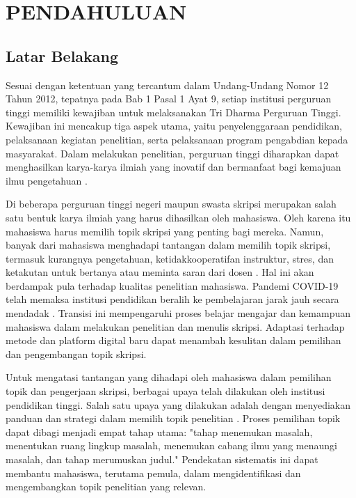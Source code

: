 \chapter{PENDAHULUAN}

\section{Latar Belakang}
Sesuai dengan ketentuan yang tercantum dalam Undang-Undang Nomor 12 Tahun 2012, tepatnya pada Bab 1 Pasal 1 Ayat 9, setiap institusi perguruan tinggi memiliki kewajiban untuk melaksanakan Tri Dharma Perguruan Tinggi. Kewajiban ini mencakup tiga aspek utama, yaitu penyelenggaraan pendidikan, pelaksanaan kegiatan penelitian, serta pelaksanaan program pengabdian kepada masyarakat. Dalam melakukan penelitian, perguruan tinggi diharapkan dapat menghasilkan karya-karya ilmiah yang inovatif dan bermanfaat bagi kemajuan ilmu pengetahuan \cite{bourner2020contribution}.

Di beberapa perguruan tinggi negeri maupun swasta skripsi merupakan salah satu bentuk karya ilmiah yang harus dihasilkan oleh mahasiswa. Oleh karena itu mahasiswa harus memilih topik skripsi yang penting bagi mereka. Namun, banyak dari mahasiswa menghadapi tantangan dalam memilih topik skripsi, termasuk kurangnya pengetahuan, ketidakkooperatifan instruktur, stres, dan ketakutan untuk bertanya atau meminta saran dari dosen \cite{khan2023challenges}. Hal ini akan berdampak pula terhadap kualitas penelitian mahasiswa. Pandemi COVID-19 telah memaksa institusi pendidikan beralih ke pembelajaran jarak jauh secara mendadak \cite{yemelyanova2023educational}. Transisi ini mempengaruhi proses belajar mengajar dan kemampuan mahasiswa dalam melakukan penelitian dan menulis skripsi. Adaptasi terhadap metode dan platform digital baru dapat menambah kesulitan dalam pemilihan dan pengembangan topik skripsi. 

Untuk mengatasi tantangan yang dihadapi oleh mahasiswa dalam pemilihan topik dan pengerjaan skripsi, berbagai upaya telah dilakukan oleh institusi pendidikan tinggi. Salah satu upaya yang dilakukan adalah dengan menyediakan panduan dan strategi dalam memilih topik penelitian \cite{nirmala2020strategi}. Proses pemilihan topik dapat dibagi menjadi empat tahap utama: "tahap menemukan masalah, menentukan ruang lingkup masalah, menemukan cabang ilmu yang menaungi masalah, dan tahap merumuskan judul." Pendekatan sistematis ini dapat membantu mahasiswa, terutama pemula, dalam mengidentifikasi dan mengembangkan topik penelitian yang relevan. 

